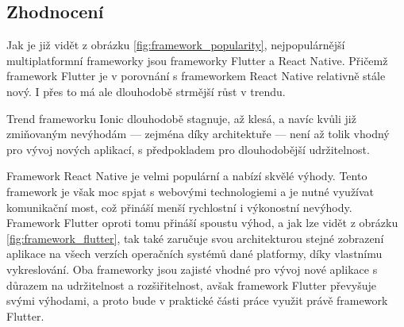 \subsection{Zhodnocení}

Jak je již vidět z obrázku \ref{fig:framework_popularity},
nejpopulárnější multiplatformní frameworky jsou frameworky Flutter a
React Native.
Přičemž framework Flutter je v porovnání s frameworkem React Native relativně
stále nový.
I přes to má ale dlouhodobě strmější růst v trendu.

Trend frameworku Ionic dlouhodobě stagnuje, až klesá,
a navíc kvůli již zmiňovaným nevýhodám
--- zejména díky architektuře ---
není až tolik vhodný pro vývoj nových aplikací,
s předpokladem pro dlouhodobější udržitelnost. 

Framework React Native je velmi populární a nabízí skvělé výhody.
Tento framework je však moc spjat s webovými technologiemi
a je nutné využívat komunikační most,
což přináší menší rychlostní i výkonostní nevýhody.
Framework Flutter oproti tomu přináší spoustu výhod,
a jak lze vidět z obrázku \ref{fig:framework_flutter},
tak také zaručuje svou architekturou stejné zobrazení aplikace na všech
verzích operačních systémů dané platformy,
díky vlastnímu vykreslování.
Oba frameworky jsou zajisté vhodné pro vývoj nové aplikace s důrazem na
udržitelnost a rozšiřitelnost,
avšak framework Flutter převyšuje svými výhodami,
a proto bude v praktické části práce využit právě framework Flutter.

